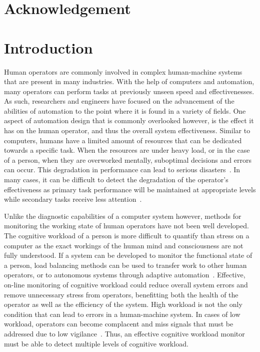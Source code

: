 \documentclass[11pt]{article}
\begin{document}
\begin{abstract}

\end{abstract}
\clearpage
\section*{Acknowledgement}

\clearpage
\tableofcontents
\listoffigures
\listoftables
\pagebreak

\cleardoublepage{}
\section{Introduction}
Human operators are commonly involved in complex human-machine systems that are present in many industries. With the help of computers and automation, many operators can perform tasks at previously unseen speed and effectivenesses. As such, researchers and engineers have focused on the advancement of the abilities of automation to the point where it is found in a variety of fields. One aspect of automation design that is commonly overlooked however, is the effect it has on the human operator, and thus the overall system effectiveness. Similar to computers, humans have a limited amount of resources that can be dedicated towards a specific task. When the resources are under heavy load, or in the case of a person, when they are overworked mentally, suboptimal decisions and errors can occur. This degradation in performance can lead to serious disasters~\cite{Wickens}. In many cases, it can be difficult to detect the degradation of the operator's effectiveness as primary task performance will be maintained at appropriate levels while secondary tasks receive less attention~\cite{Hockey}. 

Unlike the diagnostic capabilities of a computer system however, methods for monitoring the working state of human operators have not been well developed. The cognitive workload of a person is more difficult to quantify than stress on a computer as the exact workings of the human mind and consciousness are not fully understood. If a system can be developed to monitor the functional state of a person, load balancing methods can be used to transfer work to other human operators, or to autonomous systems through adaptive automation~\cite{Wilson}. Effective, on-line monitoring of cognitive workload could reduce overall system errors and remove unnecessary stress from operators, benefitting both the health of the operator as well as the efficiency of the system. High workload is not the only condition that can lead to errors in a human-machine system. In cases of low workload, operators can become complacent and miss signals that must be addressed due to low vigilance~\cite{Parasuraman}. Thus, an effective cognitive workload monitor must be able to detect multiple levels of cognitive workload.
\end{document}

